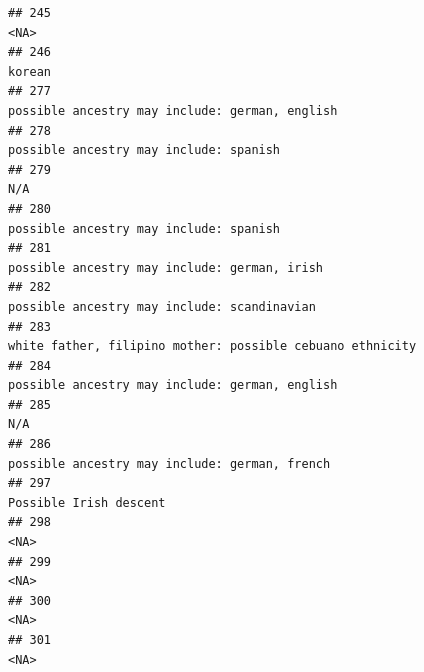 \documentclass[]{article}
\begin{document}
\begin{verbatim}
## 245                                                                                                                                                <NA>
## 246                                                                                                                                              korean
## 277                                                                                                      possible ancestry may include: german, english
## 278                                                                                                              possible ancestry may include: spanish
## 279                                                                                                                                                 N/A
## 280                                                                                                              possible ancestry may include: spanish
## 281                                                                                                        possible ancestry may include: german, irish
## 282                                                                                                         possible ancestry may include: scandinavian
## 283                                                                                           white father, filipino mother: possible cebuano ethnicity
## 284                                                                                                      possible ancestry may include: german, english
## 285                                                                                                                                                 N/A
## 286                                                                                                       possible ancestry may include: german, french
## 297                                                                                                                              Possible Irish descent
## 298                                                                                                                                                <NA>
## 299                                                                                                                                                <NA>
## 300                                                                                                                                                <NA>
## 301                                                                                                                                                <NA>

\end{verbatim}
\end{document}
